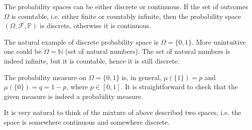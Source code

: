 \par The probability spaces can be either discrete or continuous. If the set of outcomes $\Omega$ is countable, i.e. either finite or countably infinite, then the probability space $(\Omega, \mathcal{F}, \mathbb{P})$ is discrete, otherwise it is continuous. 
\par The natural example of discrete probability space is $\Omega = \{ 0, 1 \}$. More unintuitive one could be $\Omega = \mathbb{N}$ (set of natural numbers). The set of natural numbers is indeed infinite, but it is countable, hence it is still discrete. 
\par The probability measure on $\Omega = \{0, 1\}$ is, in general, $\mu(\{1\}) = p$ and $\mu(\{0\}) = q = 1- p$, where $p \in [0, 1]$. It is straightforward to check that the given measure is indeed a probability measure. 
\begin{rmrk}
It is very natural to think of the mixture of above described two spaces, i.e. the space is somewhere continuous and somewhere discrete.
\end{rmrk}
